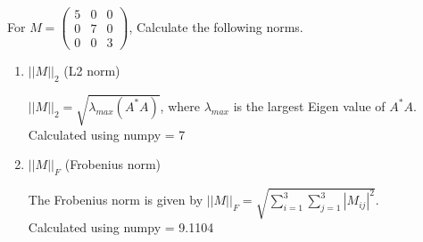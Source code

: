\documentclass[a4paper]{article}
\theoremstyle{definition}
\newenvironment{soln}{
	\leavevmode\color{blue}\ignorespaces
}{}
\begin{document}
	For $M = \begin{pmatrix}
		5 & 0 & 0 \\ 0 & 7 & 0 \\ 0 & 0 & 3
		
	\end{pmatrix}$, Calculate the following norms.
	\begin{enumerate}\addtocounter{enumi}{3}
		\item $||M||_{2}$ (L2 norm) \\
		\begin{soln}
			$||M||_{2} = \sqrt{\lambda_{max}(A^*A)}$, where $\lambda_{max}$ is the largest Eigen value of $A^*A$. \\
			Calculated using numpy = 7
		\end{soln}
		
		\item $||M||_{F}$ (Frobenius norm)\\
		\begin{soln}
			The Frobenius norm is given by $||M||_{F} = \sqrt{\sum_{i=1}^3 \sum_{j=1}^3 |M_{ij}|^2}$. \\
			Calculated using numpy = 9.1104
		\end{soln}
		
		
	\end{enumerate}
	
	
	
\end{document}
